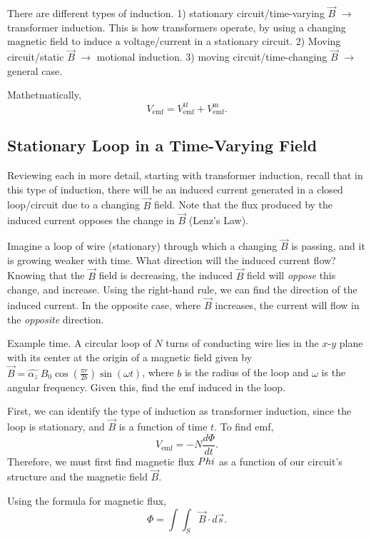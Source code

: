 \documentclass{article}
\begin{document}
There are different types of induction. 1) stationary circuit/time-varying \(\vec{B}\) \(\to\) transformer induction. This is how transformers operate, by using a changing magnetic field to induce a voltage/current in a stationary circuit. 2) Moving circuit/static \(\vec{B}\) \(\to\) motional induction. 3) moving circuit/time-changing \(\vec{B}\) \(\to\) general case.

Mathetmatically, 
\[
	V_{\mathrm{emf}} = V_{\mathrm{emf}}^{\mathrm{tf}} + V_{\mathrm{emf}}^{\mathrm{m}}.
\]

\subsection{Stationary Loop in a Time-Varying Field}

Reviewing each in more detail, starting with transformer induction, recall that in this type of induction, there will be an induced current generated in a closed loop/circuit due to a changing \(\vec{B}\) field. Note that the flux produced by the induced current opposes the change in \(\vec{B}\) (Lenz's Law). 

Imagine a loop of wire (stationary) through which a changing \(\vec{B}\) is passing, and it is growing weaker with time. What direction will the induced current flow? Knowing that the \(\vec{B}\) field is decreasing, the induced \(\vec{B}\) field will \textit{oppose} this change, and increase. Using the right-hand rule, we can find the direction of the induced current. In the opposite case, where \(\vec{B}\) increases, the current will flow in the \textit{opposite} direction.

Example time. A circular loop of \(N\) turns of conducting wire lies in the \(x\)-\(y\) plane with its center at the origin of a magnetic field given by \(\vec{B} = \hat{\alpha_z} \ B_0 \cos{(\frac{\pi r}{2b})}\sin{(\omega t)}\), where \(b\) is the radius of the loop and \(\omega\) is the angular frequency. Given this, find the emf induced in the loop.

First, we can identify the type of induction as transformer induction, since the loop is stationary, and \(\vec{B}\) is a function of time \(t\). To find emf,
\[
	V_{\mathrm{emf}} = -N \frac{d\Phi}{dt}. 
\]
Therefore, we must first find magnetic flux \(\\Phi\) as a function of our circuit's structure and the magnetic field \(\vec{B}\).

Using the formula for magnetic flux,
\[
  \Phi = \int \int_S \vec{B} \cdot d \vec{s}.  
\]
\end{document}
